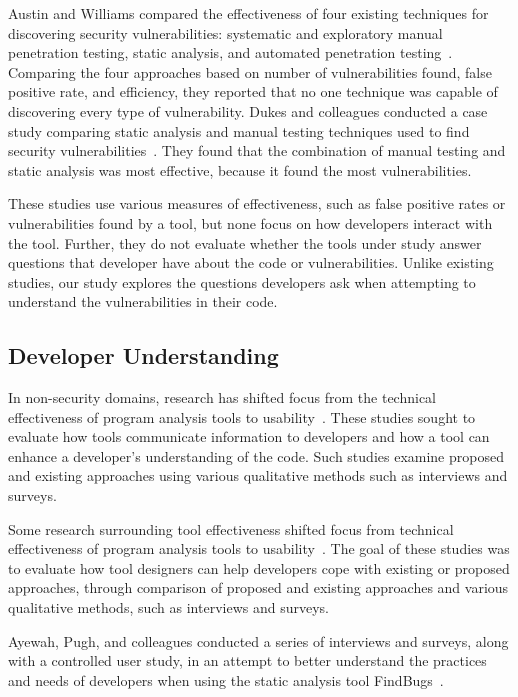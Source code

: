 \documentclass[conference]{IEEEtran}
\begin{document}
Austin and Williams compared the effectiveness of four existing techniques for discovering security vulnerabilities: systematic and exploratory manual  penetration testing, static analysis, and automated penetration testing~\cite{austin2011one}. 
Comparing the four approaches based on number of vulnerabilities found, false positive rate, and efficiency, they reported that no one technique was capable of discovering every type of vulnerability. 
Dukes and colleagues conducted a case study comparing static analysis and manual testing techniques used to find security vulnerabilities~\cite{dukes2013case}. 
They found that the combination of manual testing and static analysis was most effective, because it found the most vulnerabilities.


These studies use various measures of effectiveness, such as false positive rates or vulnerabilities found by a tool, but none focus on how developers interact with the tool. 
Further, they do not evaluate whether the tools under study answer questions that developer have about the code or vulnerabilities. 
Unlike existing studies, our study explores the questions developers ask when attempting to understand the vulnerabilities in their code.

\subsection{Developer Understanding}
\label{understanding}
In non-security domains, research has shifted focus from the technical effectiveness of program analysis tools to usability~\cite{johnson2013don, ayewah2008using, khoo2008path}. 
These studies sought to evaluate how tools communicate information to developers and how a tool can enhance a developer's understanding of the code. 
Such studies examine proposed and existing approaches using various qualitative methods such as interviews and surveys. 

Some research surrounding tool effectiveness shifted focus from technical effectiveness of program analysis tools to usability~\cite{johnson2013don, ayewah2008using, khoo2008path}. 
The goal of these studies was to evaluate how tool designers can help developers cope with existing or proposed approaches, through comparison of proposed and existing approaches and various qualitative methods, such as interviews and surveys.

Ayewah, Pugh, and colleagues conducted a series of interviews and surveys, along with a controlled user study, in an attempt to better understand the practices and needs of developers when using the static analysis tool FindBugs~\cite{ayewah2008report, ayewah2008using}.
\end{document}
